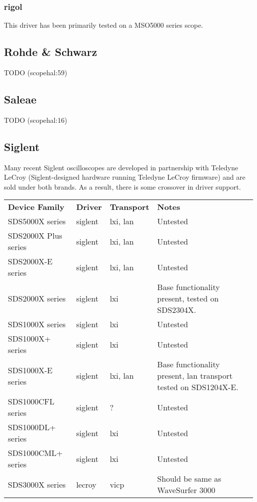 \subsubsection{rigol}

This driver has been primarily tested on a MSO5000 series scope.

\subsection{Rohde \& Schwarz}
TODO (scopehal:59)

\subsection{Saleae}
TODO (scopehal:16)

\subsection{Siglent}

Many recent Siglent oscilloscopes are developed in partnership with Teledyne LeCroy (Siglent-designed hardware running
Teledyne LeCroy firmware) and are sold under both brands. As a result, there is some crossover in driver support. \\

\begin{tabularx}{16cm}{lllX}
\thickhline
\textbf{Device Family} & \textbf{Driver} & \textbf{Transport} & \textbf{Notes} \\
\thickhline
SDS5000X series & siglent & lxi, lan & Untested \\
\thickhline
SDS2000X Plus series & siglent & lxi, lan & Untested \\
\thickhline
SDS2000X-E series & siglent & lxi, lan & Untested \\
\thickhline
SDS2000X series & siglent & lxi & Base functionality present, tested on SDS2304X. \\
\thickhline
SDS1000X series & siglent & lxi & Untested \\
\thickhline
SDS1000X+ series & siglent & lxi & Untested \\
\thickhline
SDS1000X-E series & siglent & lxi, lan & Base functionality present, lan transport tested on SDS1204X-E.\\
\thickhline
SDS1000CFL series & siglent & ? & Untested \\
\thickhline
SDS1000DL+ series & siglent & lxi & Untested \\
\thickhline
SDS1000CML+ series & siglent & lxi & Untested \\
\thickhline
SDS3000X series & lecroy & vicp & Should be same as WaveSurfer 3000 \\
\end{tabularx}

